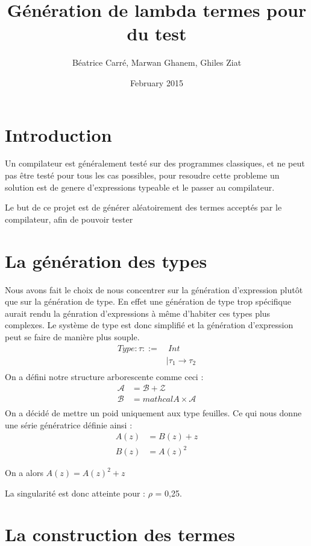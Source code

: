 \documentclass[a4paper, 11pt]{article}
\title{Génération  de lambda termes pour du test}
\author{Béatrice Carré, Marwan Ghanem, Ghiles Ziat}
\date{February 2015}
\begin{document}
\maketitle

\section{Introduction}
Un compilateur est généralement testé sur des programmes classiques, et ne peut pas être testé pour tous les cas possibles, pour resoudre cette probleme un solution est de genere d'expressions typeable et le passer au compilateur.

Le but de ce projet est de générer aléatoirement des termes acceptés par le compilateur, afin de pouvoir tester 

\section{La génération des types}
Nous avons fait le choix de nous concentrer sur la génération d'expression plutôt que sur la génération de type. En effet une génération de type trop spécifique aurait rendu la génration d'expressions à même d'habiter ces types plus complexes. 
Le système de type est donc simplifié et la génération d'expression peut se faire de manière plus souple.
\begin{align*}
Type : \tau ::= & \ Int \\
               &\mid \tau_1 \rightarrow \tau_2\\
\end{align*}
On a défini notre structure arborescente comme ceci :
\begin{align*}
    \mathcal{A} &= \mathcal{B} + \mathcal{Z} \\
    \mathcal{B} &= mathcal{A} \times \mathcal{A}\\
\end{align*}
On a décidé de mettre un poid  uniquement aux type feuilles.
Ce qui nous donne une série génératrice définie ainsi :
\begin{align*}
        A(z) &= B(z) + z \\
        B(z) &= A(z)^2
\end{align*} 

On a alors $A(z) =  A(z)^2 + z$

La singularité est donc atteinte pour : $\rho$ = 0,25.

\section{La construction des termes}
\end{document}
